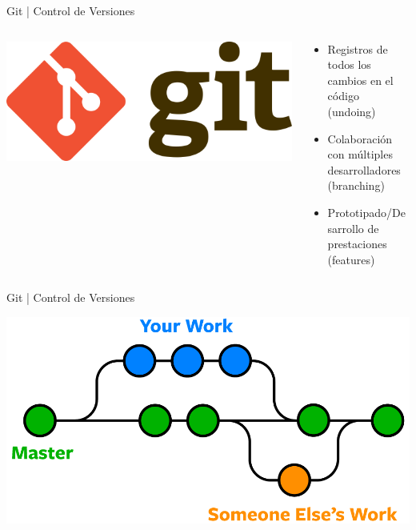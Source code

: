 \documentclass{beamer}
\begin{document}
\begin{frame}{Git | Control de Versiones}
	\begin{columns}
		\begin{column}{.3\textwidth}
			\includegraphics[scale=.1]{img/git_logo.png}
		\end{column}
		\begin{column}{.6\textwidth}
			
			\begin{itemize}
				\item Registros de todos los cambios en el código (undoing)
				\item Colaboración con múltiples desarrolladores (branching)
				\item Prototipado/Desarrollo de prestaciones (features)
			\end{itemize}
		\end{column}
	\end{columns}
\end{frame}

\begin{frame}{Git | Control de Versiones}

	\includegraphics[scale=.3]{img/branches.png}
	
\end{frame}
\end{document}
